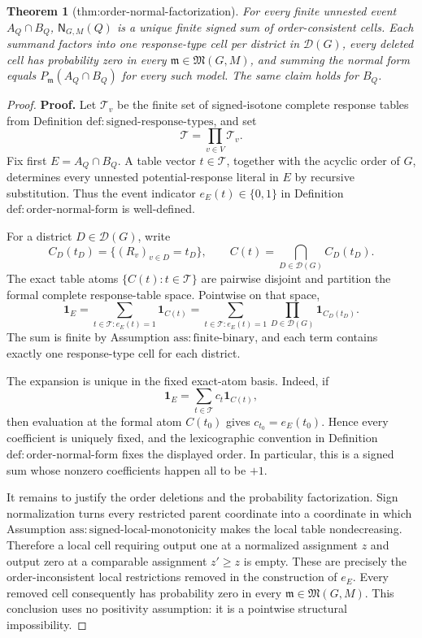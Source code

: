 \documentclass{article}
\newtheorem{theorem}{Theorem}
\begin{document}
\begin{theorem}[thm:order-normal-factorization]\label{thm:order-normal-factorization}
For every finite unnested event \(A_Q\cap B_Q\), \(\mathsf N_{G,M}(Q)\) is a unique finite signed sum of order-consistent cells. Each summand factors into one response-type cell per district in \(\mathcal D(G)\), every deleted cell has probability zero in every \(\mathfrak m\in\mathfrak M(G,M)\), and summing the normal form equals \(P_{\mathfrak m}(A_Q\cap B_Q)\) for every such model. The same claim holds for \(B_Q\).
\end{theorem}
\begin{proof}
\textbf{Proof.}
Let \(\mathcal T_v\) be the finite set of signed-isotone complete response tables from Definition \(\mathrm{def:signed\text{-}response\text{-}types}\), and set
\[
 \mathcal T=\prod_{v\in V}\mathcal T_v.
\]
Fix first \(E=A_Q\cap B_Q\).  A table vector \(t\in\mathcal T\), together with the acyclic order of \(G\), determines every unnested potential-response literal in \(E\) by recursive substitution.  Thus the event indicator \(e_E(t)\in\{0,1\}\) in Definition \(\mathrm{def:order\text{-}normal\text{-}form}\) is well-defined.

For a district \(D\in\mathcal D(G)\), write
\[
 C_D(t_D)=\{(R_v)_{v\in D}=t_D\},
 \qquad
 C(t)=\bigcap_{D\in\mathcal D(G)}C_D(t_D).
\]
The exact table atoms \(\{C(t):t\in\mathcal T\}\) are pairwise disjoint and partition the formal complete response-table space.  Pointwise on that space,
\[
 \mathbf 1_E
 =\sum_{t\in\mathcal T:e_E(t)=1}\mathbf 1_{C(t)}
 =\sum_{t\in\mathcal T:e_E(t)=1}
   \prod_{D\in\mathcal D(G)}\mathbf 1_{C_D(t_D)}.
\tag{1}
\]
The sum is finite by Assumption \(\mathrm{ass:finite\text{-}binary}\), and each term contains exactly one response-type cell for each district.

The expansion is unique in the fixed exact-atom basis.  Indeed, if
\[
 \mathbf 1_E=\sum_{t\in\mathcal T}c_t\mathbf 1_{C(t)},
\]
then evaluation at the formal atom \(C(t_0)\) gives \(c_{t_0}=e_E(t_0)\).  Hence every coefficient is uniquely fixed, and the lexicographic convention in Definition \(\mathrm{def:order\text{-}normal\text{-}form}\) fixes the displayed order.  In particular, this is a signed sum whose nonzero coefficients happen all to be \(+1\).

It remains to justify the order deletions and the probability factorization.  Sign normalization turns every restricted parent coordinate into a coordinate in which Assumption \(\mathrm{ass:signed\text{-}local\text{-}monotonicity}\) makes the local table nondecreasing.  Therefore a local cell requiring output one at a normalized assignment \(z\) and output zero at a comparable assignment \(z'\ge z\) is empty.  These are precisely the order-inconsistent local restrictions removed in the construction of \(e_E\).  Every removed cell consequently has probability zero in every \(\mathfrak m\in\mathfrak M(G,M)\).  This conclusion uses no positivity assumption: it is a pointwise structural impossibility.


\end{proof}
\end{document}
